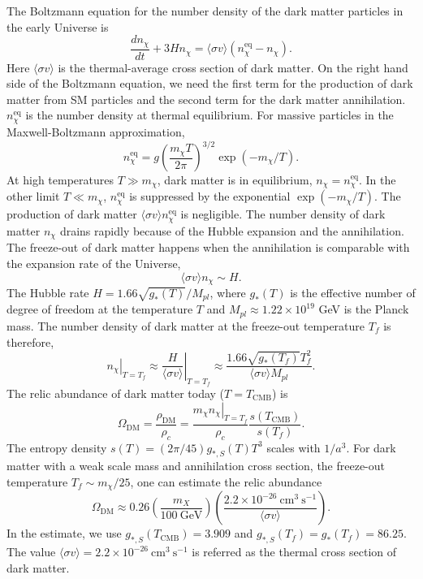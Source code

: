 \documentclass[doublespace,nopageskip]{VTthesis} %
\begin{document}
The Boltzmann equation for the number density of the dark matter particles in the early Universe is
\begin{equation}
    \frac{dn_\chi}{dt} + 3Hn_\chi = \langle\sigma v\rangle(n_\chi^{\mathrm{eq}} - n_\chi).
\end{equation}
Here $\langle\sigma v\rangle$ is the thermal-average cross section of dark matter. On the right hand side of the Boltzmann equation, we need the first term for the production of dark matter from SM particles and the second term for the dark matter annihilation. $n_\chi^{\mathrm{eq}}$ is the number density at thermal equilibrium. For massive particles in the Maxwell-Boltzmann approximation,
\begin{equation}
    n_\chi^{\mathrm{eq}} = g\left( \frac{m_\chi T}{2\pi} \right)^{3/2}\exp(-m_\chi/T).
\end{equation}
At high temperatures $T \gg m_\chi$, dark matter is in equilibrium, $n_\chi = n_\chi^{\mathrm{eq}}$. In the other limit $T \ll m_\chi$, $n_\chi^{\mathrm{eq}}$ is suppressed by the exponential $\exp(-m_\chi/T)$. The production of dark matter $\langle\sigma v\rangle n_\chi^{\mathrm{eq}}$ is negligible. The number density of dark matter $n_\chi$ drains rapidly because of the Hubble expansion and the annihilation. The freeze-out of dark matter happens when the annihilation is comparable with the expansion rate of the Universe,
\begin{equation}
    \langle\sigma v\rangle n_\chi \sim H.
\end{equation}
The Hubble rate $H = 1.66\sqrt{g_*(T)}/M_{pl}$, where $g_*(T)$ is the effective number of degree of freedom at the temperature $T$ and $M_{pl} \approx 1.22\times 10^{19}$ GeV is the Planck mass. The number density of dark matter at the freeze-out temperature $T_f$ is therefore,
\begin{equation}
    \left.n_\chi\right|_{T = T_f} \approx \left.\frac{H}{\langle\sigma v\rangle}\right|_{T = T_f} \approx \frac{1.66\sqrt{g_*(T_f)}T_f^2}{\langle\sigma v\rangle M_{pl}}.
\end{equation}
The relic abundance of dark matter today ($T=T_\mathrm{CMB}$) is
\begin{equation}
    \Omega_\mathrm{DM} = \frac{\rho_\mathrm{DM}}{\rho_c} = \frac{\left. m_\chi n_\chi\right|_{T = T_f}}{\rho_c}\frac{s(T_\mathrm{CMB})}{s(T_f)}.
\end{equation}
The entropy density $s(T) = (2\pi/45)g_{*,S}(T)T^3$ scales with $1/a^3$. For dark matter with a weak scale mass and annihilation cross section, the freeze-out temperature $T_f \sim m_\chi/25$, one can estimate the relic abundance
\begin{equation}
    \Omega_\mathrm{DM} \approx 0.26 \left( \frac{m_X}{100\ \mathrm{GeV}} \right) \left( \frac{2.2\times 10^{-26}\ \mathrm{cm}^3\ \mathrm{s}^{-1}}{\langle\sigma v\rangle} \right).
\end{equation}
In the estimate, we use $g_{*,S}(T_\mathrm{CMB}) = 3.909$ and $g_{*,S}(T_f) = g_{*}(T_f) = 86.25$. The value $\langle\sigma v\rangle = 2.2\times 10^{-26}\ \mathrm{cm}^3\ \mathrm{s}^{-1}$ is referred as the thermal cross section of dark matter.
\end{document}
